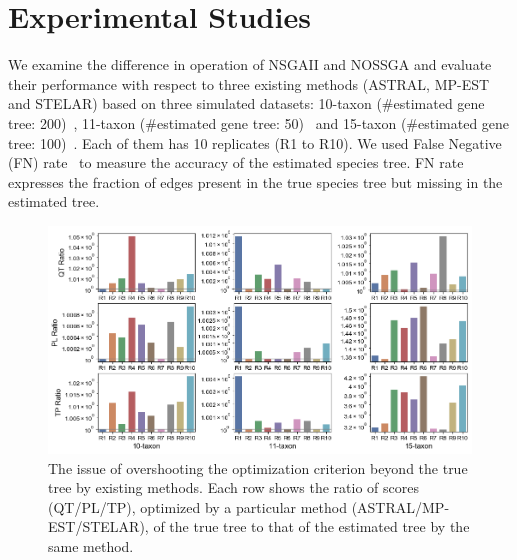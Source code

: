 \section{Experimental Studies}
\label{sec:experiment}
We examine the difference in operation of NSGAII and NOSSGA and evaluate their performance with respect to three existing methods (ASTRAL, MP-EST and STELAR) based on three simulated datasets: 10-taxon (\#estimated gene tree: 200)~\cite{bayzid2015weighted}, 11-taxon (\#estimated gene tree: 50)~\cite{chung2011comparing} and 15-taxon (\#estimated gene tree: 100)~\cite{statistical-binning}. Each of them has 10 replicates (R1 to R10). We used False Negative (FN) rate~\cite{bayzid2013naive} to measure the accuracy of the estimated species tree. FN rate expresses the fraction of edges present in the true species tree but missing in the estimated tree. %

\begin{figure}
	\begin{adjustwidth}{-4cm}{-3cm}
		\centering	
		\includegraphics[width=1.6\textwidth]{Figure/tool_ratio}
	\end{adjustwidth}
		\caption{The issue of overshooting the optimization criterion beyond the true tree by existing methods. Each row shows the ratio of scores (QT/PL/TP), optimized by a particular method (ASTRAL/MP-EST/STELAR), of the true tree to that of the estimated tree by the same method.} \label{fig:tool_ratio}

	
\end{figure}

